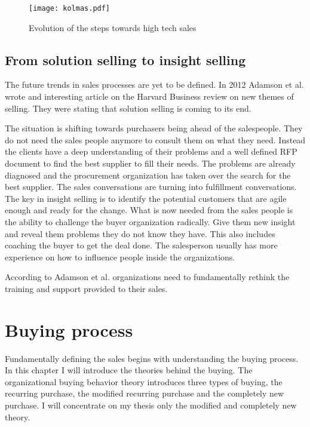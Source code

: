 \documentclass[12pt,a4paper,oneside,pdftex]{report}
\begin{document}
{{\begin{figure}[ht]
  \begin{center}
    \texttt{[image: kolmas.pdf]}
    \caption{Evolution of the steps towards high tech sales}
    \label{fig:kolmas}
  \end{center}
\end{figure}

\subsection{From solution selling to insight selling}
The future trends in sales processes are yet to be defined. In 2012 Adamson et al. wrote and interesting article on the Harvard Business review on new themes of selling. They were stating that solution selling is coming to its end. 

The situation is shifting towards purchasers being ahead of the salespeople. They do not need the sales people anymore to consult them on what they need. Instead the clients have a deep understanding of their problems and a well defined RFP document to find the best supplier to fill their needs. The problems are already diagnosed and the procurement organization has taken over the search for the best supplier. The sales conversations are turning into fulfillment conversations. 
The key in insight selling is to identify the potential customers that are agile enough and ready for the change. What is now needed from the sales people is the ability to challenge the buyer organization radically. Give them new insight and reveal them problems they do not know they have. 
This also includes coaching the buyer to get the deal done. The salesperson usually has more experience on how to influence people inside the organizations. 

According to Adamson et al. organizations need to fundamentally rethink the training and support provided to their sales. 

\section{Buying process}


Fundamentally defining the sales begins with understanding the buying process. In this chapter I will introduce the theories behind the buying. The organizational buying behavior theory introduces three types of buying, the recurring purchase, the modified recurring purchase and the completely new purchase. I will concentrate on my thesis only the modified and completely new theory. 

}}
\end{document}
